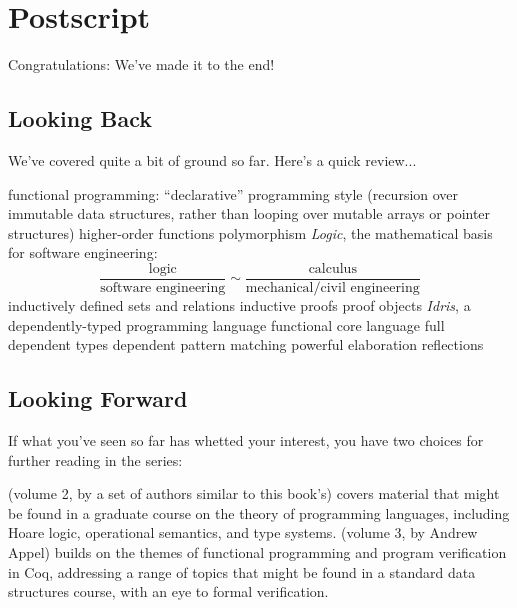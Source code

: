 \chapter{Postscript}
\label{postscript}

Congratulations: We've made it to the end!

\section{Looking Back}

We've covered quite a bit of ground so far. Here's a quick review...

\begin{outline}
\1 \Gls{functional programming}:
  \2 ``declarative'' programming style (recursion over immutable data
  structures, rather than looping over mutable arrays or pointer structures)
  \2 higher-order functions
  \2 polymorphism
\1 \textit{Logic}, the mathematical basis for software engineering:
  \[
    \frac{\text{logic}}{\text{software engineering}} \sim
    \frac{\text{calculus}}{\text{mechanical/civil engineering}}
  \]
  \2 inductively defined sets and relations
  \2 inductive proofs
  \2 proof objects
\1 \textit{Idris}, a dependently-typed programming language
  \2 functional core language
  \2 full \glspl{dependent type}
  \2 \gls{dependent pattern matching}
  \2 powerful \glspl{elaboration reflection}
\end{outline}


\section{Looking Forward}

If what you've seen so far has whetted your interest, you have two choices for
further reading in the  series:

\begin{outline}
\1  (volume 2, by a set of authors similar to this
  book's) covers material that might be found in a graduate course on the theory
  of programming languages, including Hoare logic, operational semantics, and
  type systems.
\1  (volume 3, by Andrew Appel) builds on the themes
  of functional programming and program verification in Coq, addressing a range
  of topics that might be found in a standard data structures course, with an
  eye to formal verification.
\end{outline}


